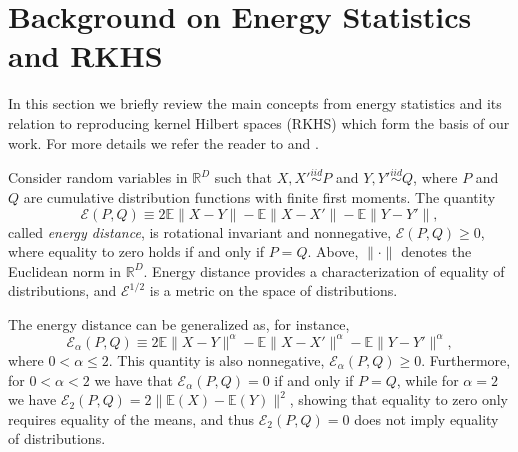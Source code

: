 \documentclass[aps,preprint,nofootinbib,floatfix]{revtex4-1}
\newcommand\Energy{\mathcal{E}}
\newcommand\E{\mathbb{E}}
\begin{document}
\section{Background on Energy Statistics and RKHS}
\label{sec:background}

In this section we briefly review the main concepts from energy
statistics and its relation to reproducing kernel Hilbert spaces 
(RKHS) which form the basis of our work.
For more details we refer the reader
to \cite{Szkely2013} and \cite{Sejdinovic2013}.

Consider random variables in $\mathbb{R}^D$ 
such that $X,X' \stackrel{iid}{\sim} P$ and 
$Y,Y' \stackrel{iid}{\sim} Q$, where $P$ and $Q$ are cumulative
distribution functions with finite first moments. 
The quantity \cite{Szkely2013}
\begin{equation}
\label{eq:energy}
\Energy(P, Q) \equiv 2 \E \| X - Y\| - \E \| X - X' \| - \E \| Y - Y' \|,
\end{equation}
called \emph{energy distance}, 
is rotational invariant and nonnegative, $\Energy(P,Q) \ge 0$, where
equality
to zero holds if and only if $P = Q$.
Above, $\| \cdot \|$ denotes the
Euclidean norm in $\mathbb{R}^D$. 
Energy distance
provides a characterization of equality of distributions, and
$\Energy^{1/2}$ is
a metric on the space of distributions.

The energy distance can be generalized as, for instance,
\begin{equation}
\label{eq:energy2}
\Energy_\alpha(P, Q) \equiv 
2 \E \| X - Y\|^{\alpha} - \E \| X - X' \|^{\alpha} - 
\E \| Y - Y' \|^{\alpha},
\end{equation}
where $0<\alpha\le 2$. This quantity is also nonnegative,
$\Energy_\alpha(P,Q) \ge 0$. Furthermore, for $0<\alpha<2$ we have that
$\Energy_\alpha(P,Q) = 0$ if and only if $P=Q$, while for $\alpha=2$ 
we have $\Energy_2(P,Q) = 2\| \E(X) - \E(Y) \|^2$, showing that
equality to zero only requires
equality of the means, and thus $\Energy_2(P,Q)=0$ does 
not imply equality of distributions.
\end{document}
